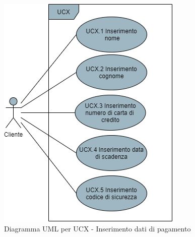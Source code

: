 

\begin{figure}[H]
\centering
\includegraphics[scale=0.6]{res/UseCase/Immagini/InserimentoDatiPagamento}
\caption{Diagramma UML per UCX - Inserimento dati di pagamento}
\end{figure}

